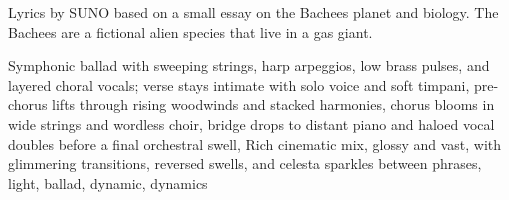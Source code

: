 
\begin{notes}
Lyrics by SUNO based on a small essay on the Bachees planet and biology. The Bachees are a fictional alien species that live in a gas giant.
\end{notes}
\begin{style}
Symphonic ballad with sweeping strings, harp arpeggios, low brass pulses, and layered choral vocals; verse stays intimate with solo voice and soft timpani, pre-chorus lifts through rising woodwinds and stacked harmonies, chorus blooms in wide strings and wordless choir, bridge drops to distant piano and haloed vocal doubles before a final orchestral swell, Rich cinematic mix, glossy and vast, with glimmering transitions, reversed swells, and celesta sparkles between phrases, light, ballad, dynamic, dynamics
\end{style}
